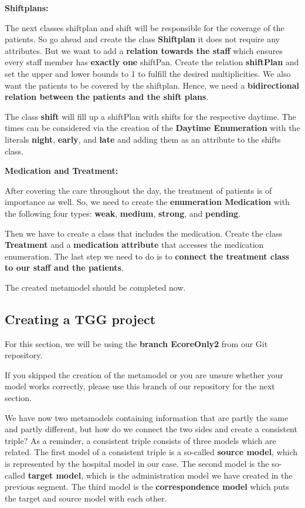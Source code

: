 \textbf{Shiftplans:}

The next classes shiftplan and shift will be responsible for the coverage of the patients. So go ahead and create the class \textbf{Shiftplan} it does not require any attributes. But we want to add a \textbf{relation towards the staff} which ensures every staff member has \textbf{exactly one} shiftPan. Create the relation \textbf{shiftPlan} and set the upper and lower bounds to 1 to fulfill the desired multiplicities. We also want the patients to be covered by the shiftplan. Hence, we need a \textbf{bidirectional relation between the patients and the shift plans}.


The class \textbf{shift} will fill up a shiftPlan with shifts for the respective daytime. The times can be considered via the creation of the \textbf{Daytime Enumeration} with the literals \textbf{night}, \textbf{early}, and \textbf{late} and adding them as an attribute to the shifts class.\newline

\textbf{Medication and Treatment:}

After covering the care throughout the day, the treatment of patients is of importance as well. So, we need to create the \textbf{enumeration Medication} with the following four types: \textbf{weak}, \textbf{medium}, \textbf{strong}, and \textbf{pending}.

Then we have to create a class that includes the medication. Create the class \textbf{Treatment} and a \textbf{medication attribute} that accesses the medication enumeration. The last step we need to do is to \textbf{connect the treatment class to our staff and the patients}. \newline

The created metamodel should be completed now.

\subsection{Creating a TGG project}

For this section, we will be using the \textbf{branch \textsf{EcoreOnly2}} from our Git repository.

If you skipped the creation of the metamodel or you are unsure whether your model works correctly, please use this branch of our repository for the next section.\newline

We have now two metamodels containing information that are partly the same and partly different, but how do we connect the two sides and create a consistent triple? As a reminder, a consistent triple consists of three models which are related. The first model of a consistent triple is a so-called \textbf{source model}, which is represented by the hospital model in our case. The second model is the so-called \textbf{target model}, which is the administration model we have created in the previous segment. The third model is the \textbf{correspondence model} which puts the target and source model with each other.\newline

